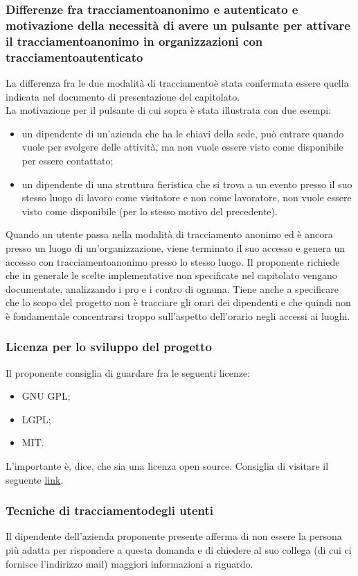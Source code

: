 \subsubsection*{Differenze fra tracciamentoanonimo e autenticato e motivazione della necessità di avere un pulsante per attivare il tracciamentoanonimo in organizzazioni con tracciamentoautenticato}
La differenza fra le due modalità di tracciamentoè stata confermata essere quella indicata nel documento di presentazione del capitolato.\\
La motivazione per il pulsante di cui sopra è stata illustrata con due esempi:
\begin{itemize}
	\item un dipendente di un'azienda che ha le chiavi della sede, può entrare quando vuole per svolgere delle attività, ma non vuole essere visto come disponibile per essere contattato;
	\item un dipendente di una struttura fieristica che si trova a un evento presso il suo stesso luogo di lavoro come visitatore e non come lavoratore, non vuole essere visto come disponibile (per lo stesso motivo del precedente).
\end{itemize}
Quando un utente passa nella modalità di tracciamento anonimo ed è ancora presso un luogo di un'organizzazione, viene terminato il suo accesso e genera un accesso con tracciamentoanonimo presso lo stesso luogo.
Il proponente richiede che in generale le scelte implementative non specificate nel capitolato vengano documentate, analizzando i pro e i contro di ognuna. Tiene anche a specificare che lo scopo del progetto non è
tracciare gli orari dei dipendenti e che quindi non è fondamentale concentrarsi troppo sull'aspetto dell'orario negli accessi ai luoghi.

\subsubsection*{Licenza per lo sviluppo del progetto}
Il proponente consiglia di guardare fra le seguenti licenze:
\begin{itemize}
	\item GNU GPL;
	\item LGPL;
	\item MIT.
\end{itemize}
L'importante è, dice, che sia una licenza open source. Consiglia di visitare il seguente \href{https://opensource.org/licenses}{link}.

\subsubsection*{Tecniche di tracciamentodegli utenti}
Il dipendente dell'azienda proponente presente afferma di non essere la persona più adatta per rispondere a questa domanda e di chiedere al suo collega (di cui ci fornisce l'indirizzo mail) maggiori informazioni a riguardo.


